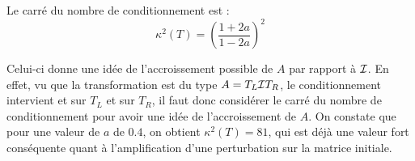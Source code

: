 Le carré du nombre de conditionnement est :
\begin{equation} \label{equatkappa}
	\kappa^2 (T) = \left(\frac{1+2a}{1-2a}\right)^2
\end{equation}

Celui-ci donne une idée de l'accroissement possible de $A$ par rapport à $\mathcal{I}$.
En effet, vu que la transformation est du type $A = T_L \mathcal{I} T_R$,
le conditionnement intervient et sur $T_L$ et sur $T_R$,
il faut donc considérer le carré du nombre de conditionnement pour avoir une idée de l'accroissement de $A$. On constate que pour une valeur de $a$ de $0.4$, on obtient $\kappa^2 (T) = 81$, qui est déjà une valeur fort conséquente quant à l'amplification d'une perturbation sur la matrice initiale.
